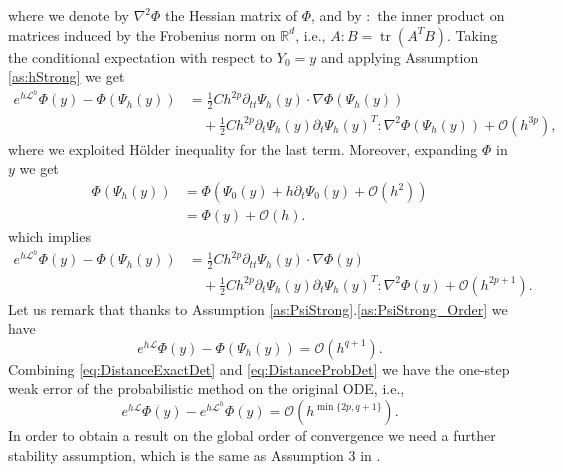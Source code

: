 \documentclass{siamart1116}
\numberwithin{theorem}{section}
\newcommand{\R}{\mathbb{R}}
\newcommand{\OO}{\mathcal{O}}
\newcommand{\diffL}{\mathcal{L}}
\newcommand{\trace}{\operatorname{tr}}
\newcommand{\corr}[1]{{\color{bordeaux}#1}}
\begin{document}
where we denote by $\nabla^2\Phi$ the Hessian matrix of $\Phi$, and by $\colon$ the inner product on matrices induced by the Frobenius norm on $\R^d$, i.e., $A\colon B = \trace(A^TB)$. Taking the conditional expectation with respect to $Y_0 = y$ \corr{and applying Assumption \ref{as:hStrong}} we get
\begin{equation}
\begin{aligned}
	e^{h\diffL^h}\Phi(y) - \Phi(\Psi_h(y)) &= \frac{1}{2} Ch^{2p}\partial_{tt}\Psi_h(y)\cdot \nabla\Phi(\Psi_h(y))\\
	&\quad + \frac{1}{2} Ch^{2p}\partial_t \Psi_h(y) \partial_t \Psi_h(y)^T \colon \nabla^2\Phi(\Psi_h(y)) + \OO(h^{3p}),
\end{aligned}
\end{equation}
where we exploited Hölder inequality for the last term. Moreover, expanding $\Phi$ in $y$ we get
\begin{equation}
\begin{aligned}
	\Phi(\Psi_h(y)) &= \Phi\left(\Psi_0(y) + h\partial_t \Psi_0(y) + \OO(h^2)\right) \\
	&= \Phi(y) + \OO(h).
\end{aligned}
\end{equation}
which implies
\begin{equation}\label{eq:DistanceProbDet}
\begin{aligned}
	e^{h\diffL^h}\Phi(y) - \Phi(\Psi_h(y)) &= \frac{1}{2} Ch^{2p}\partial_{tt}\Psi_h(y) \cdot \nabla\Phi(y)\\
	&\quad +\frac{1}{2}Ch^{2p}\partial_t \Psi_h(y) \partial_t \Psi_h(y)^T \colon \nabla^2\Phi(y) + \OO(h^{2p+1}).
\end{aligned}
\end{equation}
Let us remark that thanks to Assumption \ref{as:PsiStrong}.\ref{as:PsiStrong_Order} we have
\begin{equation}\label{eq:DistanceExactDet}
	e^{h\diffL}\Phi(y) - \Phi(\Psi_h(y)) = \OO(h^{q+1}).
\end{equation}
Combining \eqref{eq:DistanceExactDet} and \eqref{eq:DistanceProbDet} we have the one-step weak error of the probabilistic method on the original ODE, i.e., 
\begin{equation}\label{eq:LocalWeakError}
	e^{h\diffL}\Phi(y) - e^{h\diffL^h}\Phi(y) = \OO(h^{\min\{2p, q+1\}}).
\end{equation}
In order to obtain a result on the global order of convergence we need a further stability assumption, which is the same as Assumption 3 in \cite{CGS16}.
\end{document}
